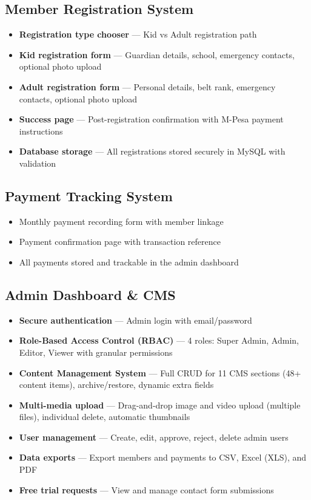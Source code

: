 \documentclass[12pt,a4paper]{article}
\begin{document}
\subsection{Member Registration System}

\begin{itemize}[leftmargin=1.5em]
    \item \textbf{Registration type chooser} --- Kid vs Adult registration path
    \item \textbf{Kid registration form} --- Guardian details, school, emergency contacts, optional photo upload
    \item \textbf{Adult registration form} --- Personal details, belt rank, emergency contacts, optional photo upload
    \item \textbf{Success page} --- Post-registration confirmation with M-Pesa payment instructions
    \item \textbf{Database storage} --- All registrations stored securely in MySQL with validation
\end{itemize}

\subsection{Payment Tracking System}

\begin{itemize}[leftmargin=1.5em]
    \item Monthly payment recording form with member linkage
    \item Payment confirmation page with transaction reference
    \item All payments stored and trackable in the admin dashboard
\end{itemize}

\subsection{Admin Dashboard \& CMS}

\begin{itemize}[leftmargin=1.5em]
    \item \textbf{Secure authentication} --- Admin login with email/password
    \item \textbf{Role-Based Access Control (RBAC)} --- 4 roles: Super Admin, Admin, Editor, Viewer with granular permissions
    \item \textbf{Content Management System} --- Full CRUD for 11 CMS sections (48+ content items), archive/restore, dynamic extra fields
    \item \textbf{Multi-media upload} --- Drag-and-drop image and video upload (multiple files), individual delete, automatic thumbnails
    \item \textbf{User management} --- Create, edit, approve, reject, delete admin users
    \item \textbf{Data exports} --- Export members and payments to CSV, Excel (XLS), and PDF
    \item \textbf{Free trial requests} --- View and manage contact form submissions
\end{itemize}
\end{document}
